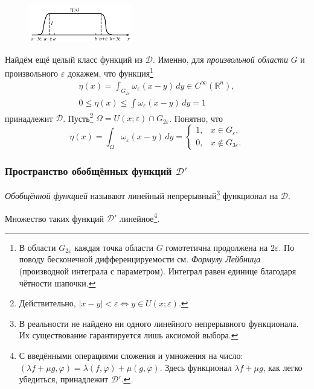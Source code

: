 \begin{figure}
	\centering
	\includegraphics[width=0.4\textwidth]{img/eta(x).png}
\end{figure}
Найдём ещё целый класс функций из $ \mathcal D $.
Именно, для \textsl{произвольной области} $ G $ и произвольного $ \varepsilon $
докажем, что функция\footnote{В области $ G_{2\varepsilon} $ каждая точка
	области $ G $ гомотетична продолжена на $ 2\varepsilon $. По поводу бесконечной
	дифференцируемости см.
	\emph{Формулу Лейбница} (производной интеграла с параметром). Интеграл равен единице благодаря чётности шапочки.} 
\begin{gather*}
	\eta(x) = \int_{G_{2\varepsilon}} \omega_\varepsilon(x-y)\, dy \in
	C^\infty(\mathbb R^n),\\
	0 \leqslant \eta(x) \leqslant \int\omega_\varepsilon(x-y)\, dy = 1
\end{gather*}
принадлежит $ \mathcal D $. Пусть\footnote{ Действительно, $ |x - y|
	< \varepsilon \Leftrightarrow y \in U(x; \varepsilon) $.} $ \Omega = U(x; \varepsilon) \cap
G_{2\varepsilon}$.  Понятно, что  
\[
\eta(x) = \int_{\Omega} \omega_\varepsilon(x - y)\, dy = \begin{cases}
	1, & x \in G_\varepsilon,\\
	0, & x\notin G_{3\varepsilon}.
\end{cases}
\]

\subsubsection{Пространство обобщённых функций $ \mathcal D' $}
\emph{Обобщённой функцией} называют линейный непрерывный\footnote{В реальности
	не найдено ни одного линейного непрерывного функционала. Их существование
	гарантируется лишь аксиомой выбора.} функционал на $
\mathcal D $. 

Множество таких функций $ \mathcal D' $ линейное\footnote{С введёнными
	операциями сложения и умножения на число: $ (\lambda f + \mu g,\varphi) =
	\lambda(f,\varphi) + \mu(g,\varphi) $. Здесь функционал $ \lambda f + \mu g $,
	как легко убедиться, принадлежит $ \mathcal D' $.}.

